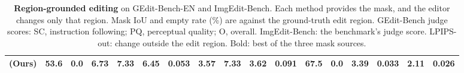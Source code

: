 \begin{table}[t]
{\begin{tabular}{l cc ccc c ccc c cc cc cc}
\rowcolor{oursrow}
\ours{} (Ours)             & 53.6 & \textbf{0.0} & \textbf{6.73} & 7.33 & \textbf{6.45} & 0.053 & \textbf{3.57} & 7.33 & \textbf{3.62} & 0.091 & \textbf{67.5} & \textbf{0.0} & 3.39 & 0.033 & \textbf{2.11} & \textbf{0.026} \\
\bottomrule
\end{tabular}}
\caption{\textbf{Region-grounded editing} on GEdit-Bench-EN and ImgEdit-Bench. Each method provides the mask, and the
editor changes only that region. Mask IoU and empty rate (\%) are against the ground-truth edit region. GEdit-Bench
judge scores: SC, instruction following; PQ, perceptual quality; O, overall. ImgEdit-Bench: the benchmark's judge
score. LPIPS-out: change outside the edit region. Bold: best of the three mask sources.}
\label{tab:editing}
\end{table}
